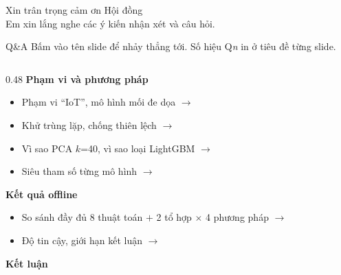 \documentclass[aspectratio=169, 11pt]{beamer}
\begin{document}
{
\begin{frame}[standout]
  Xin trân trọng cảm ơn Hội đồng\\[0.6em]
  {\Large Em xin lắng nghe các ý kiến nhận xét và câu hỏi.}
\end{frame}
}

\appendix

\begin{frame}{Q\&A}
  \scriptsize
  Bấm vào tên slide để nhảy thẳng tới. Số hiệu Q\emph{n} in ở tiêu đề từng slide.
  \vspace{0.3em}
  \begin{columns}[T]
    \begin{column}{0.48\textwidth}
      \textbf{Phạm vi và phương pháp}
      \begin{itemize}
        \item[\key{Q1}] Phạm vi ``IoT'', mô hình mối đe dọa
              $\rightarrow$ \hyperlink{bk-scope}{}
        \item[\key{Q2}] Khử trùng lặp, chống thiên lệch
              $\rightarrow$ \hyperlink{bk-prep}{}
        \item[\key{Q3}] Vì sao PCA $k$=40, vì sao loại LightGBM
              $\rightarrow$ \hyperlink{bk-pca}{}
        \item[\key{Q4}] Siêu tham số từng mô hình
              $\rightarrow$ \hyperlink{bk-hparams}{}
      \end{itemize}
      \vspace{0.2em}
      \textbf{Kết quả offline}
      \begin{itemize}
        \item[\key{Q5}] So sánh đầy đủ 8 thuật toán $+$ 2 tổ hợp $\times$ 4 phương pháp
              $\rightarrow$ \hyperlink{bk-heatmap}{}
        \item[\key{Q6}] Độ tin cậy, giới hạn kết luận
              $\rightarrow$ \hyperlink{bk-threats}{}
      \end{itemize}
      \vspace{0.2em}
      \textbf{Kết luận}
      \begin{itemize}

\end{itemize}
\end{column}
\end{columns}
\end{frame}
\end{document}
